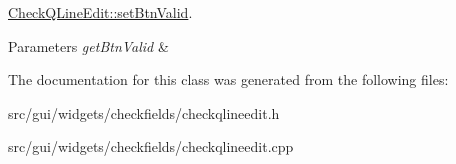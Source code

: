 \hyperlink{classGui_1_1Widgets_1_1CheckFields_1_1CheckQLineEdit_aa5f2ef2358512cf6e7d2eb4af58deb8d}{Check\+Q\+Line\+Edit\+::set\+Btn\+Valid}. 


\begin{DoxyParams}{Parameters}
{\em get\+Btn\+Valid} & \\
\hline
\end{DoxyParams}


The documentation for this class was generated from the following files\+:\begin{DoxyCompactItemize}
\item 
src/gui/widgets/checkfields/checkqlineedit.\+h\item 
src/gui/widgets/checkfields/checkqlineedit.\+cpp\end{DoxyCompactItemize}
